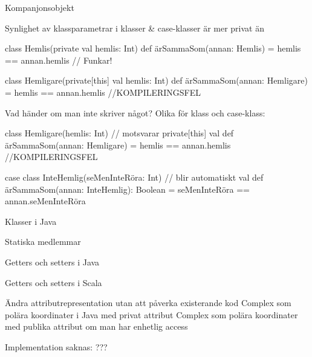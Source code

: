 \begin{Slide}{Kompanjonsobjekt}
\end{Slide}


\begin{Slide}{Synlighet av klassparametrar i klasser \& case-klasser}\SlideFontSmall
{} är  mer privat än  
\begin{Code}
class Hemlis(private val hemlis: Int) {
  def ärSammaSom(annan: Hemlis) = hemlis == annan.hemlis   // Funkar!
}

class Hemligare(private[this] val hemlis: Int) {
  def ärSammaSom(annan: Hemligare) = hemlis == annan.hemlis //KOMPILERINGSFEL
}
\end{Code}
Vad händer om man inte skriver något? Olika för klass och case-klass:
\begin{Code}
class Hemligare(hemlis: Int) { // motsvarar private[this] val
  def ärSammaSom(annan: Hemligare) = hemlis == annan.hemlis //KOMPILERINGSFEL
}

case class InteHemlig(seMenInteRöra: Int) { // blir automatiskt val 
  def ärSammaSom(annan: InteHemlig): Boolean = 
    seMenInteRöra == annan.seMenInteRöra 
}

\end{Code}
\end{Slide}



\begin{Slide}{Klasser i Java}
\end{Slide}

\begin{Slide}{Statiska medlemmar}
\end{Slide}



\begin{Slide}{Getters och setters i Java}
\end{Slide}

\begin{Slide}{Getters och setters i Scala}
\end{Slide}

\begin{Slide}{Ändra attributrepresentation utan att påverka existerande kod}
Complex som polära koordinater i Java med privat attribut
Complex som polära koordinater med publika attribut om man har enhetlig access
\end{Slide}



\begin{Slide}{Implementation saknas: ???}
\end{Slide}


\fi

